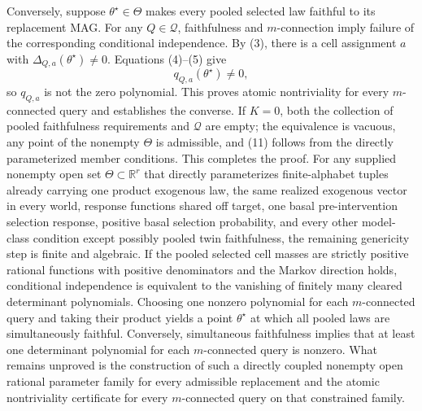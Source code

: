 Conversely, suppose \(\theta^\star\in\Theta\) makes every pooled selected law faithful to its replacement MAG. For any \(Q\in\mathcal Q\), faithfulness and \(m\)-connection imply failure of the corresponding conditional independence. By (3), there is a cell assignment \(a\) with \(\Delta_{Q,a}(\theta^\star)\ne0\). Equations (4)--(5) give
\[
 q_{Q,a}(\theta^\star)\ne0,
 \tag{12}
\]
so \(q_{Q,a}\) is not the zero polynomial. This proves atomic nontriviality for every \(m\)-connected query and establishes the converse. If \(K=0\), both the collection of pooled faithfulness requirements and \(\mathcal Q\) are empty; the equivalence is vacuous, any point of the nonempty \(\Theta\) is admissible, and (11) follows from the directly parameterized member conditions. This completes the proof.
For any supplied nonempty open set \(\Theta\subset\mathbb R^r\) that directly parameterizes finite-alphabet tuples already carrying one product exogenous law, the same realized exogenous vector in every world, response functions shared off target, one basal pre-intervention selection response, positive basal selection probability, and every other model-class condition except possibly pooled twin faithfulness, the remaining genericity step is finite and algebraic. If the pooled selected cell masses are strictly positive rational functions with positive denominators and the Markov direction holds, conditional independence is equivalent to the vanishing of finitely many cleared determinant polynomials. Choosing one nonzero polynomial for each \(m\)-connected query and taking their product yields a point \(\theta^\star\) at which all pooled laws are simultaneously faithful. Conversely, simultaneous faithfulness implies that at least one determinant polynomial for each \(m\)-connected query is nonzero. What remains unproved is the construction of such a directly coupled nonempty open rational parameter family for every admissible replacement and the atomic nontriviality certificate for every \(m\)-connected query on that constrained family.
